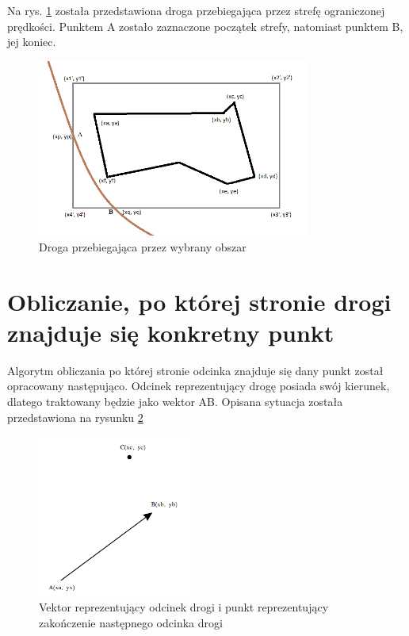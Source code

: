 Na rys. \ref{sec:minBoundingBoxWay} została przedstawiona droga przebiegająca przez strefę ograniczonej prędkości. Punktem A zostało zaznaczone początek strefy, natomiast punktem B, jej koniec. 
\begin{figure}[h]
\caption{Droga przebiegająca przez wybrany obszar}
\label{sec:minBoundingBoxWay}
\centering
\includegraphics[width=0.8\textwidth]{minBoundingBoxWay}
\end{figure}

\newpage

\section{Obliczanie, po której stronie drogi znajduje się konkretny punkt}
Algorytm obliczania po której stronie odcinka znajduje się dany punkt został opracowany następująco. Odcinek reprezentujący drogę posiada swój kierunek, dlatego traktowany będzie jako wektor AB. Opisana sytuacja została przedstawiona na rysunku \ref{sec:VectorPoint}


\begin{figure}[h]
\caption{Vektor reprezentujący odcinek drogi i punkt reprezentujący zakończenie następnego odcinka drogi}
\label{sec:VectorPoint}
\centering
\includegraphics[width=0.45\textwidth]{vectorPoint}
\end{figure}


